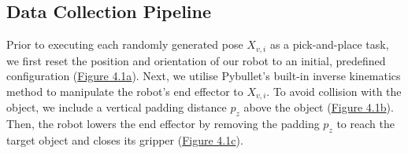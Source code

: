 \documentclass[11pt, a4paper]{report}
\begin{document}
\newpage
\subsection{Data Collection Pipeline}\label{sec:4.2.2}
Prior to executing each randomly generated pose $X_{v,i}$ as a pick-and-place task, we first reset the position and orientation of our robot to an initial, predefined configuration (\hyperref[fig:4.1a]{Figure 4.1a}). Next, we utilise Pybullet's built-in inverse kinematics method to manipulate the robot's end effector to $X_{v,i}$. To avoid collision with the object, we include a vertical padding distance $p_z$ above the object (\hyperref[fig:4.1b]{Figure 4.1b}). Then, the robot lowers the end effector by removing the padding $p_z$ to reach the target object and closes its gripper (\hyperref[fig:4.1c]{Figure 4.1c}).
\end{document}
